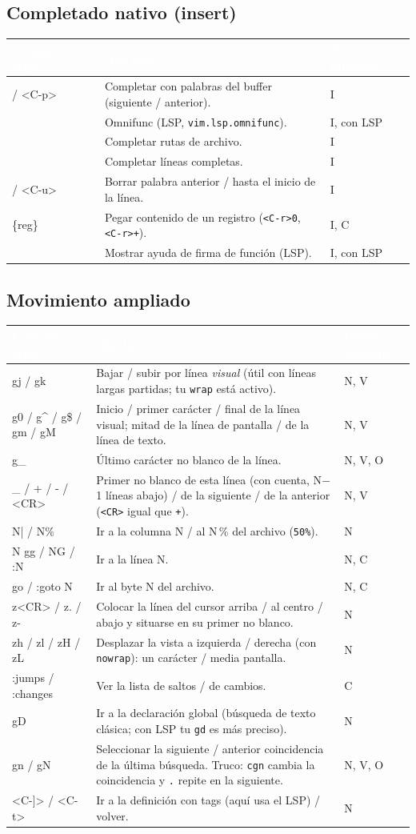 \documentclass[8pt,a4paper,landscape]{extarticle}
\newcommand{\kk}[1]{\texttt{#1}}
\newcommand{\ca}{\textasciicircum{}}
\newenvironment{cht}{%
  \begin{longtable}{>{\raggedright\arraybackslash\ttfamily}p{0.27\textwidth}
                    >{\raggedright\arraybackslash}p{0.46\textwidth}
                    >{\raggedright\arraybackslash}p{0.21\textwidth}}
  \rowcolor{accent}\textcolor{white}{\textbf{\rmfamily Comando / atajo}} &
  \textcolor{white}{\textbf{Qué hace}} & \textcolor{white}{\textbf{Dónde funciona}} \\
  \endhead
}{\end{longtable}}
\newcommand{\rr}[3]{#1 & #2 & #3 \\}
\newcommand{\rg}[3]{\rowcolor{rowgray}\relax #1 & #2 & #3 \\}
\let\oldsubsection\subsection
\renewcommand{\subsection}{\Needspace{9\baselineskip}\oldsubsection}
\begin{document}
\subsection{Completado nativo (insert)}
\begin{cht}
\rg{<C-n> / <C-p>}{Completar con palabras del buffer (siguiente / anterior).}{I}
\rr{<C-x><C-o>}{Omnifunc (LSP, \kk{vim.lsp.omnifunc}).}{I, con LSP}
\rg{<C-x><C-f>}{Completar rutas de archivo.}{I}
\rr{<C-x><C-l>}{Completar líneas completas.}{I}
\rg{<C-w> / <C-u>}{Borrar palabra anterior / hasta el inicio de la línea.}{I}
\rr{<C-r>\{reg\}}{Pegar contenido de un registro (\kk{<C-r>0}, \kk{<C-r>+}).}{I, C}
\rg{<C-s>}{Mostrar ayuda de firma de función (LSP).}{I, con LSP}
\end{cht}


\subsection{Movimiento ampliado}
\begin{cht}
\rg{gj / gk}{Bajar / subir por línea \emph{visual} (útil con líneas largas partidas; tu \kk{wrap} está activo).}{N, V}
\rr{g0 / g\ca{} / g\$ / gm / gM}{Inicio / primer carácter / final de la línea visual; mitad de la línea de pantalla / de la línea de texto.}{N, V}
\rg{g\_}{Último carácter no blanco de la línea.}{N, V, O}
\rr{\_ / + / - / <CR>}{Primer no blanco de esta línea (con cuenta, N$-$1 líneas abajo) / de la siguiente / de la anterior (\kk{<CR>} igual que \kk{+}).}{N, V}
\rg{N| / N\%}{Ir a la columna N / al N\,\% del archivo (\kk{50\%}).}{N}
\rr{N gg / NG / :N}{Ir a la línea N.}{N, C}
\rg{go / :goto N}{Ir al byte N del archivo.}{N, C}
\rr{z<CR> / z. / z-}{Colocar la línea del cursor arriba / al centro / abajo y situarse en su primer no blanco.}{N}
\rg{zh / zl / zH / zL}{Desplazar la vista a izquierda / derecha (con \kk{nowrap}): un carácter / media pantalla.}{N}
\rr{:jumps / :changes}{Ver la lista de saltos / de cambios.}{C}
\rg{gD}{Ir a la declaración global (búsqueda de texto clásica; con LSP tu \kk{gd} es más preciso).}{N}
\rr{gn / gN}{Seleccionar la siguiente / anterior coincidencia de la última búsqueda. Truco: \kk{cgn} cambia la coincidencia y \kk{.} repite en la siguiente.}{N, V, O}
\rg{<C-]> / <C-t>}{Ir a la definición con tags (aquí usa el LSP) / volver.}{N}
\end{cht}
\end{document}
